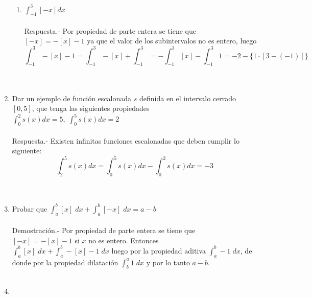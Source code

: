 \begin{enumerate}
\begin{enumerate}[\bfseries (a)]
	\item $\displaystyle\int_{-1}^{3} [-x] dx$\\\\
	    Respuesta.-\; Por propiedad de parte entera se tiene que $[-x]=-[x]-1$ ya que el valor de los subintervalos no es entero, luego $$\displaystyle\int_{-1}^{3} -[x] - 1 = \int_{-1}^{3} -[x] + \int_{-1}^{3} = -\int_{-1}^{3} [x] - \int_{-1}^{3} 1 = -2 - \lbrace 1\cdot \left[3-(-1)\right]\rbrace$$\\\\

    \end{enumerate}


    \item Dar un ejemplo de función escalonada $s$ definida en el intervalo cerrado $[0,5]$, que tenga las siguientes propiedades $\displaystyle\int_{0}^{2} s(x) dx = 5,\; \int_{0}^{5}s(x) dx = 2$\\\\
	Respuesta.-\; Existen infinitas funciones escalonadas que deben cumplir lo siguiente: 
	$$\displaystyle\int_{2}^{5} s(x) dx = \int_{0}^{5} s(x) dx - \int_{0}^{2} s(x) dx=-3$$\\\\

    \item Probar que $\displaystyle\int_{a}^{b} [x] \; dx + \int_{a}^{b}[-x] \; dx = a - b$\\\\
	Demostración.-\; Por propiedad de parte entera se tiene que $[-x]=-[x]-1$ si $x$ no es entero. Entonces $\displaystyle\int_{a}^{b} [x] \; dx + \int_{a}^{b} -[x]-1 \; dx$ luego por la propiedad aditiva $\displaystyle\int_{a}^{b} -1 \; dx$, de donde por la propiedad dilatación $\displaystyle\int_{b}^{a} 1 \; dx$ y por lo tanto $a-b$.\\\\ 

    \item 
    \begin{enumerate}[\bfseries (a)]
	

\end{enumerate}
\end{enumerate}
